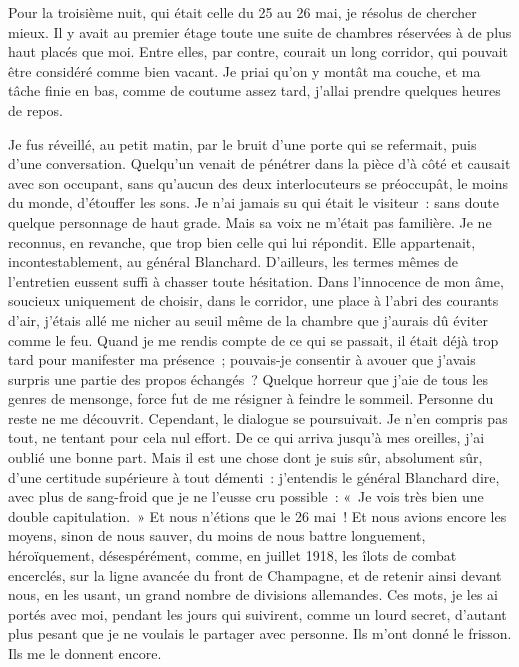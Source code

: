 \documentclass[french,twoside]{book} %
\begin{document}
Pour la troisième nuit, qui était celle du 25 au 26 mai, je résolus de chercher mieux. Il y avait au premier étage toute une suite de chambres réservées à de plus haut placés que moi. Entre elles, par contre, courait un long corridor, qui pouvait être considéré comme bien vacant. Je priai qu’on y montât ma couche, et ma tâche finie en bas, comme de coutume assez tard, j’allai prendre quelques heures de repos.\par
Je fus réveillé, au petit matin, par le bruit d’une porte qui se refermait, puis d’une conversation. Quelqu’un venait de pénétrer dans la pièce d’à côté et causait avec son occupant, sans qu’aucun des deux interlocuteurs se préoccupât, le moins du monde, d’étouffer les sons. Je n’ai jamais su qui était le visiteur : sans doute quelque personnage de haut grade. Mais sa voix ne m’était pas familière. Je ne reconnus, en revanche, que trop bien celle qui lui répondit. Elle appartenait, incontestablement, au général Blanchard. D’ailleurs, les termes mêmes de l’entretien eussent suffi à chasser toute hésitation. Dans l’innocence de mon âme, soucieux uniquement de choisir, dans le corridor, une place à l’abri des courants d’air, j’étais allé me nicher au seuil même de la chambre que j’aurais dû éviter comme le feu. Quand je me rendis compte de ce qui se passait, il était déjà trop tard pour manifester ma présence ; pouvais-je consentir à avouer que j’avais surpris une partie des propos échangés ? Quelque horreur que j’aie de tous les genres de mensonge, force fut de me résigner à   feindre le sommeil. Personne du reste ne me découvrit. Cependant, le dialogue se poursuivait. Je n’en compris pas tout, ne tentant pour cela nul effort. De ce qui arriva jusqu’à mes oreilles, j’ai oublié une bonne part. Mais il est une chose dont je suis sûr, absolument sûr, d’une certitude supérieure à tout démenti : j’entendis le général Blanchard dire, avec plus de sang-froid que je ne l’eusse cru possible : « Je vois très bien une double capitulation. » Et nous n’étions que le 26 mai ! Et nous avions encore les moyens, sinon de nous sauver, du moins de nous battre longuement, héroïquement, désespérément, comme, en juillet 1918, les îlots de combat encerclés, sur la ligne avancée du front de Champagne, et de retenir ainsi devant nous, en les usant, un grand nombre de divisions allemandes. Ces mots, je les ai portés avec moi, pendant les jours qui suivirent, comme un lourd secret, d’autant plus pesant que je ne voulais le partager avec personne. Ils m’ont donné le frisson. Ils me le donnent encore.\par
\end{document}
